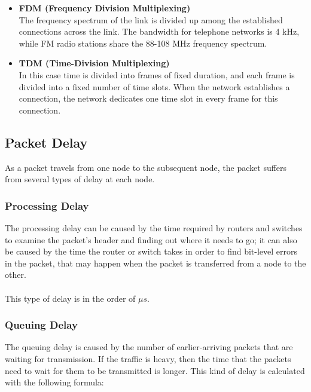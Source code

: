 \documentclass{article}
\begin{document}
\begin{itemize}
	\item \textbf{FDM (Frequency Division Multiplexing)}
	\vspace{.2cm} \\
	The frequency spectrum of the link is divided up among the established connections across the link. The bandwidth for telephone networks is 4 kHz, while FM radio stations share the 88-108 MHz frequency spectrum.
	
	\item \textbf{TDM (Time-Division Multiplexing)}
	\vspace{.2cm} \\
	In this case time is divided into frames of fixed duration, and each frame is divided into a fixed number of time slots. When the network establishes a connection, the network dedicates one time slot in every frame for this connection. 
\end{itemize}

\subsection{Packet Delay}
As a packet travels from one node to the subsequent node, the packet suffers from several types of delay at each node.

\subsubsection{Processing Delay}
The processing delay can be caused by the time required by routers and switches to examine the packet's header and finding out where it needs to go; it can also be caused by the time the router or switch takes in order to find bit-level errors in the packet, that may happen when the packet is transferred from a node to the other. \\ \\
This type of delay is in the order of $\mu s$.

\subsubsection{Queuing Delay}
The queuing delay is caused by the number of earlier-arriving packets that are waiting for transmission. If the traffic is heavy, then the time that the packets need to wait for them to be transmitted is longer. This kind of delay is calculated with the following formula: \\
\end{document}
